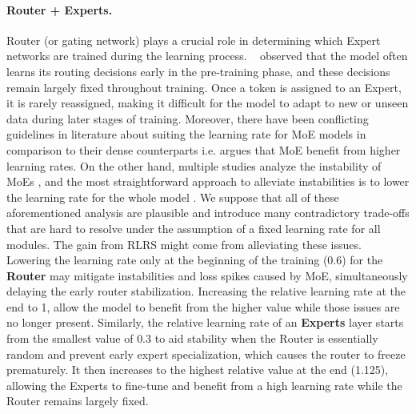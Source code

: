 \documentclass{article} %
\begin{document}
    \paragraph{Router + Experts.} Router (or gating network) plays a crucial role in determining which Expert networks are trained during the learning process. ~\citet{xue2024openmoe} observed that the model often learns its routing decisions early in the pre-training phase, and these decisions remain largely fixed throughout training. Once a token is assigned to an Expert, it is rarely reassigned, making it difficult for the model to adapt to new or unseen data during later stages of training. Moreover, there have been conflicting guidelines in literature about suiting the learning rate for MoE models in comparison to their dense counterparts i.e. \citep{zoph2022st} argues that MoE benefit from higher learning rates. On the other hand, multiple studies analyze the instability of MoEs \citep{fedus2022switch}, and the most straightforward approach to alleviate instabilities is to lower the learning rate for the whole model \citep{wortsman2023small}. We suppose that all of these aforementioned analysis are plausible and introduce many contradictory trade-offs that are hard to resolve under the assumption of a fixed learning rate for all modules. The gain from RLRS might come from alleviating these issues. Lowering the learning rate only at the beginning of the training (0.6) for the \textbf{Router} may mitigate instabilities and loss spikes caused by MoE, simultaneously delaying the early router stabilization. Increasing the relative learning rate at the end to 1, allow the model to benefit from the higher value while those issues are no longer present. Similarly, the relative learning rate of an \textbf{Experts} layer starts from the smallest value of $0.3$ to aid stability when the Router is essentially random and prevent early expert specialization, which causes the router to freeze prematurely. It then increases to the highest relative value at the end (1.125), allowing the Experts to fine-tune and benefit from a high learning rate while the Router remains largely fixed.
\end{document}
